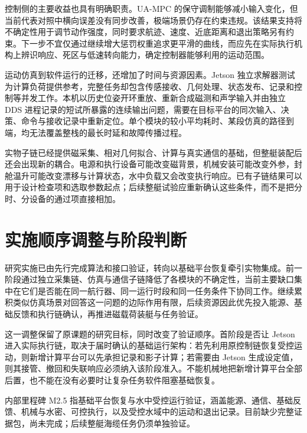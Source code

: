 控制侧的主要收益也具有明确职责。UA-MPC 的保守调制能够减小输入变化，但当前代表对照中横向误差没有同步改善，极端场景仍存在约束违规。该结果支持将不确定性用于调节动作强度，同时要求航迹、速度、近底距离和退出策略另有约束。下一步不宜仅通过继续增大惩罚权重追求更平滑的曲线，而应先在实际执行机构上辨识响应、死区与低速转向能力，确定控制器能够利用的运动范围。

运动仿真到软件运行的迁移，还增加了时间与资源因素。Jetson 独立求解器测试为计算负荷提供参考，完整任务却包含传感接收、几何处理、状态发布、记录和控制等并发工作。本机以历史位姿开环重放、重新合成磁测和声学输入并由独立 DDS 进程记录的短试所暴露的连续输出问题，需要在目标平台的同次输入、决策、命令与接收记录中重新定位。单个模块的较小平均耗时、某段仿真的路径到端，均无法覆盖整栈的最长时延和故障传播过程。

实物子链已经提供磁采集、相对几何拟合、计算与真实通信的基础，但整艇装配后还会出现新的耦合。电源和执行设备可能改变磁背景，机械安装可能改变外参，封舱温升可能改变漂移与计算状态，水中负载又会改变执行响应。已有子链结果可以用于设计检查项和选取参数起点；后续整艇试验应重新确认这些条件，而不是把分时、分设备的通过项直接相加。

\section{实施顺序调整与阶段判断}

研究实施已由先行完成算法和接口验证，转向以基础平台恢复牵引实物集成。前一阶段通过独立采集链、仿真与通信子链降低了各模块的不确定性，当前主要缺口集中在它们是否能在同一航行器、同一运行时段和同一任务条件下协同工作。继续累积类似仿真场景对回答这一问题的边际作用有限，后续资源因此优先投入能源、基础反馈和执行链确认，再推进磁载荷装艇与任务验证。

这一调整保留了原课题的研究目标，同时改变了验证顺序。首阶段是否让 Jetson 进入实际执行链，取决于届时确认的基础运行架构：若先利用原控制链恢复受控运动，则新增计算平台可以先承担记录和影子计算；若需要由 Jetson 生成设定值，则其接管、撤回和失联响应必须纳入该阶段准入。不能机械地把新增计算平台全部后置，也不能在没有必要时让复杂任务软件阻塞基础恢复。

内部里程碑 M2.5 指基础平台恢复与水中受控运行验证，涵盖能源、通信、基础反馈、机械与水密、可控执行，以及受控水域中的运动和退出记录。目前缺少完整证据包，尚未完成；后续整艇海缆任务仍须单独验证。
